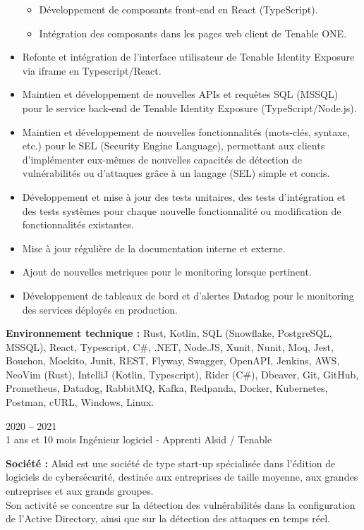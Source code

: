 \documentclass[8pt]{developercv} %
\begin{document}
\begin{itemize}
\begin{itemize}
            \item Développement de composants front-end en React (TypeScript).
            \item Intégration des composants dans les pages web client de Tenable ONE.
        \end{itemize}
    \item Refonte et intégration de l’interface utilisateur de Tenable Identity Exposure via iframe en Typescript/React.
    \item Maintien et développement de nouvelles APIs et requêtes SQL (MSSQL) pour le service back-end de Tenable Identity Exposure (TypeScript/Node.js).
    \item Maintien et développement de nouvelles fonctionnalités (mots-clés, syntaxe, etc.) pour le SEL (Security Engine Language), permettant aux clients d'implémenter eux-mêmes de nouvelles capacités de détection de vulnérabilités ou d'attaques grâce à un langage (SEL) simple et concis.
    \item Développement et mise à jour des tests unitaires, des tests d’intégration et des tests systèmes pour chaque nouvelle fonctionnalité ou modification de fonctionnalités existantes.
    \item Mise à jour régulière de la documentation interne et externe.
    \item Ajout de nouvelles metriques pour le monitoring lorsque pertinent.
    \item Développement de tableaux de bord et d'alertes Datadog pour le monitoring des services déployés en production.
\end{itemize}
\vspace{\baselineskip}
\textbf{Environnement technique :} Rust, Kotlin, SQL (Snowflake, PostgreSQL, MSSQL), React, Typescript, C\#, .NET, Node.JS, Xunit, Nunit, Moq, Jest, Bouchon, Mockito, Junit, REST, Flyway, Swagger, OpenAPI, Jenkins, AWS, NeoVim (Rust), IntelliJ (Kotlin, Typescript), Rider (C\#), Dbeaver, Git, GitHub, Prometheus, Datadog, RabbitMQ, Kafka, Redpanda, Docker, Kubernetes, Postman, cURL, Windows, Linux.\\
\vspace{\baselineskip}
\begin{entrylisthrules}
    \entry
    {2020 -- 2021\\\footnotesize{1 ans et 10 mois}}
    {Ingénieur logiciel - Apprenti}
    {Alsid / Tenable}
    {}
\end{entrylisthrules}

\textbf{Société :} Alsid est une société de type start-up spécialisée dans l'édition de logiciels de cybersécurité, destinée aux entreprises de taille moyenne, aux grandes entreprises et aux grands groupes.\\
Son activité se concentre sur la détection des vulnérabilités dans la configuration de l'Active Directory, ainsi que sur la détection des attaques en temps réel.\\
\end{document}
